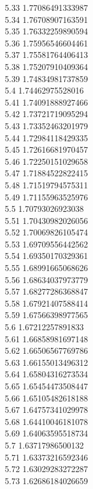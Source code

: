 {5.33	1.77086491333987\\
5.34	1.76708907163591\\
5.35	1.76332259890594\\
5.36	1.75956546604461\\
5.37	1.75581764406413\\
5.38	1.75207910409364\\
5.39	1.74834981737859\\
5.4	1.74462975528016\\
5.41	1.74091888927466\\
5.42	1.73721719095294\\
5.43	1.73352463201979\\
5.44	1.72984118429335\\
5.45	1.72616681970457\\
5.46	1.72250151029658\\
5.47	1.71884522822415\\
5.48	1.71519794575311\\
5.49	1.71155963525976\\
5.5	1.70793026923038\\
5.51	1.70430982026056\\
5.52	1.70069826105474\\
5.53	1.69709556442562\\
5.54	1.69350170329361\\
5.55	1.68991665068626\\
5.56	1.68634037973779\\
5.57	1.68277286368847\\
5.58	1.67921407588414\\
5.59	1.67566398977565\\
5.6	1.67212257891833\\
5.61	1.66858981697148\\
5.62	1.66506567769786\\
5.63	1.66155013496312\\
5.64	1.65804316273534\\
5.65	1.65454473508447\\
5.66	1.65105482618188\\
5.67	1.64757341029978\\
5.68	1.64410046181078\\
5.69	1.64063595518734\\
5.7	1.63717986500132\\
5.71	1.63373216592346\\
5.72	1.63029283272287\\
5.73	1.62686184026659\\
}
